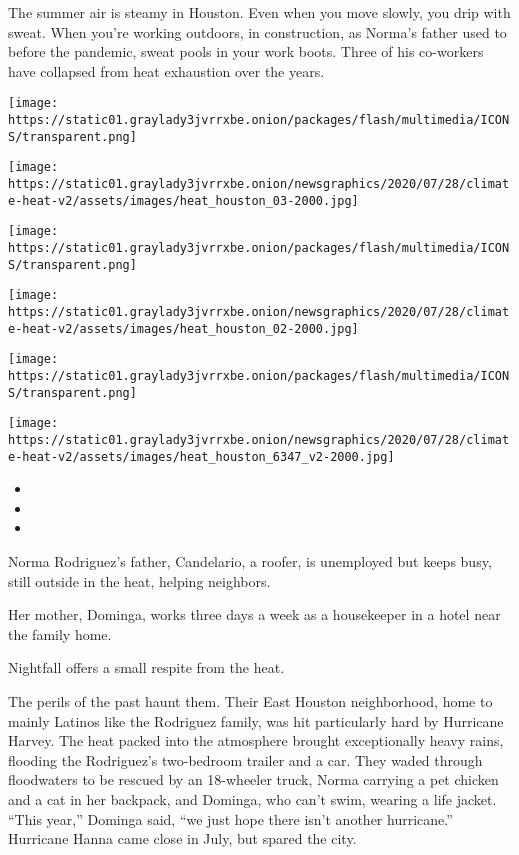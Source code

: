 The summer air is steamy in Houston. Even when you move slowly, you drip
with sweat. When you're working outdoors, in construction, as Norma's
father used to before the pandemic, sweat pools in your work boots.
Three of his co-workers have collapsed from heat exhaustion over the
years.

\texttt{[image: https://static01.graylady3jvrrxbe.onion/packages/flash/multimedia/ICONS/transparent.png]}

\texttt{[image: https://static01.graylady3jvrrxbe.onion/newsgraphics/2020/07/28/climate-heat-v2/assets/images/heat\_houston\_03-2000.jpg]}

\texttt{[image: https://static01.graylady3jvrrxbe.onion/packages/flash/multimedia/ICONS/transparent.png]}

\texttt{[image: https://static01.graylady3jvrrxbe.onion/newsgraphics/2020/07/28/climate-heat-v2/assets/images/heat\_houston\_02-2000.jpg]}

\texttt{[image: https://static01.graylady3jvrrxbe.onion/packages/flash/multimedia/ICONS/transparent.png]}

\texttt{[image: https://static01.graylady3jvrrxbe.onion/newsgraphics/2020/07/28/climate-heat-v2/assets/images/heat\_houston\_6347\_v2-2000.jpg]}

\begin{itemize}
\item
\item
\item
\end{itemize}

Norma Rodriguez's father, Candelario, a roofer, is unemployed but keeps
busy, still outside in the heat, helping neighbors.

Her mother, Dominga, works three days a week as a housekeeper in a hotel
near the family home.

Nightfall offers a small respite from the heat.

The perils of the past haunt them. Their East Houston neighborhood, home
to mainly Latinos like the Rodriguez family, was hit particularly hard
by Hurricane Harvey. The heat packed into the atmosphere brought
exceptionally heavy rains, flooding the Rodriguez's two-bedroom trailer
and a car. They waded through floodwaters to be rescued by an 18-wheeler
truck, Norma carrying a pet chicken and a cat in her backpack, and
Dominga, who can't swim, wearing a life jacket. ``This year,'' Dominga
said, ``we just hope there isn't another hurricane.'' Hurricane Hanna
came close in July, but spared the city.

